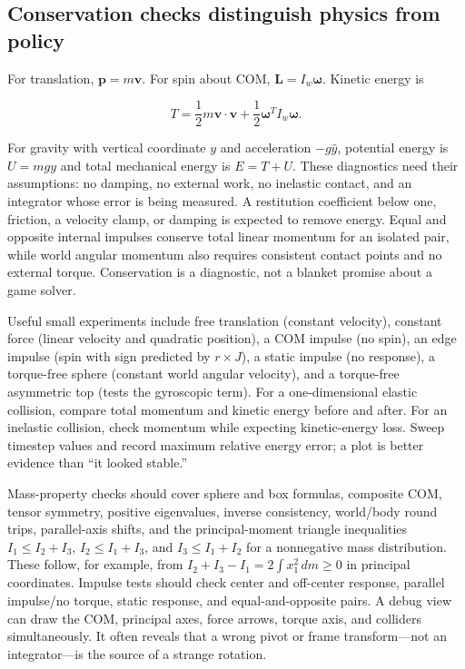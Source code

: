 
\subsection{Conservation checks distinguish physics from policy}\label{06-engine-ii-ch034-conservation-checks-distinguish-physics-from-policy}

\hypertarget{06-engine-ii-ch034-conservation-checks-distinguish-physics-from-policy}{}

For translation, \(\mathbf p=m\mathbf v\). For spin about COM, \(\mathbf L=I_w\boldsymbol\omega\). Kinetic energy is

\[
T=\frac12m\mathbf v\cdot\mathbf v+\frac12\boldsymbol\omega^T I_w\boldsymbol\omega.
\]

For gravity with vertical coordinate \(y\) and acceleration \(-g\hat y\), potential energy is \(U=mgy\) and total mechanical energy is \(E=T+U\). These diagnostics need their assumptions: no damping, no external work, no inelastic contact, and an integrator whose error is being measured. A restitution coefficient below one, friction, a velocity clamp, or damping is expected to remove energy. Equal and opposite internal impulses conserve total linear momentum for an isolated pair, while world angular momentum also requires consistent contact points and no external torque. Conservation is a diagnostic, not a blanket promise about a game solver.

Useful small experiments include free translation (constant velocity), constant force (linear velocity and quadratic position), a COM impulse (no spin), an edge impulse (spin with sign predicted by \(r\times J\)), a static impulse (no response), a torque-free sphere (constant world angular velocity), and a torque-free asymmetric top (tests the gyroscopic term). For a one-dimensional elastic collision, compare total momentum and kinetic energy before and after. For an inelastic collision, check momentum while expecting kinetic-energy loss. Sweep timestep values and record maximum relative energy error; a plot is better evidence than ``it looked stable.''

Mass-property checks should cover sphere and box formulas, composite COM, tensor symmetry, positive eigenvalues, inverse consistency, world/body round trips, parallel-axis shifts, and the principal-moment triangle inequalities \(I_1\le I_2+I_3\), \(I_2\le I_1+I_3\), and \(I_3\le I_1+I_2\) for a nonnegative mass distribution. These follow, for example, from \(I_2+I_3-I_1=2\int x_1^2\,dm\ge0\) in principal coordinates. Impulse tests should check center and off-center response, parallel impulse/no torque, static response, and equal-and-opposite pairs. A debug view can draw the COM, principal axes, force arrows, torque axis, and colliders simultaneously. It often reveals that a wrong pivot or frame transform---not an integrator---is the source of a strange rotation.

